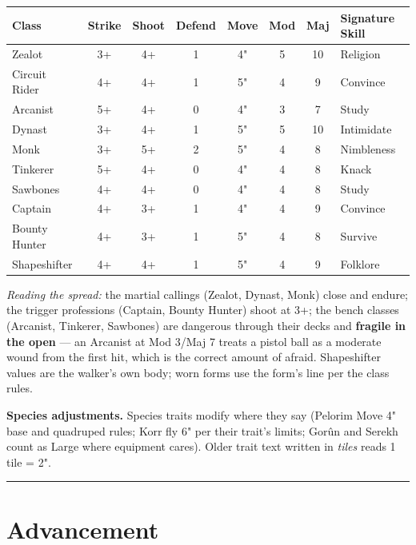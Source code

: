 \begin{center}
\small
\begin{tabular}{l|cc|c|c|cc|l}
\textbf{Class} & \textbf{Strike} & \textbf{Shoot} & \textbf{Defend} & \textbf{Move} & \textbf{Mod} & \textbf{Maj} & \textbf{Signature Skill} \\
\hline
Zealot & 3+ & 4+ & 1 & 4" & 5 & 10 & Religion \\
Circuit Rider & 4+ & 4+ & 1 & 5" & 4 & 9 & Convince \\
Arcanist & 5+ & 4+ & 0 & 4" & 3 & 7 & Study \\
Dynast & 3+ & 4+ & 1 & 5" & 5 & 10 & Intimidate \\
Monk & 3+ & 5+ & 2 & 5" & 4 & 8 & Nimbleness \\
Tinkerer & 5+ & 4+ & 0 & 4" & 4 & 8 & Knack \\
Sawbones & 4+ & 4+ & 0 & 4" & 4 & 8 & Study \\
Captain & 4+ & 3+ & 1 & 4" & 4 & 9 & Convince \\
Bounty Hunter & 4+ & 3+ & 1 & 5" & 4 & 8 & Survive \\
Shapeshifter & 4+ & 4+ & 1 & 5" & 4 & 9 & Folklore \\
\end{tabular}
\end{center}

\textit{Reading the spread:} the martial callings (Zealot, Dynast, Monk) close and endure; the trigger professions (Captain, Bounty Hunter) shoot at 3+; the bench classes (Arcanist, Tinkerer, Sawbones) are dangerous through their decks and \textbf{fragile in the open} --- an Arcanist at Mod 3/Maj 7 treats a pistol ball as a moderate wound from the first hit, which is the correct amount of afraid. Shapeshifter values are the walker's own body; worn forms use the form's line per the class rules.

\textbf{Species adjustments.} Species traits modify where they say (Pelorim Move 4" base and quadruped rules; Korr fly 6" per their trait's limits; Gorûn and Serekh count as Large where equipment cares). Older trait text written in \textit{tiles} reads 1 tile = 2".

\medskip\hrule\medskip

\section{Advancement}

